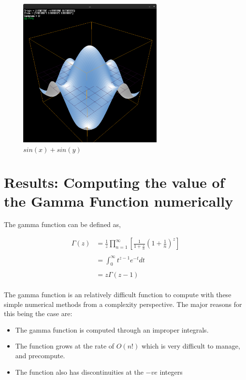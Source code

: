\documentclass[12pt]{article}
\begin{document}
\begin{figure}
	\centering
	\includegraphics[width=0.65\textwidth]{example2.png}
	\caption{$sin(x) + sin(y)$}
	\label{fig:example2}
\end{figure}

\pagebreak
\section{Results: Computing the value of the Gamma Function numerically}

The gamma function can be defined as,

\begin{align*}
	\Gamma(z) &= \frac{1}{z} \prod_{n = 1}^{\infty} \left[ \frac{1}{1 + \frac{z}{n}} \left(1 + \frac{1}{n} \right)^{z} \right]\\
	\\
	&= \int_0^\infty t^{z-1} e^{-t} dt\\
	\\
	&= z \Gamma(z - 1)
\end{align*}
\\
The gamma function is an relatively difficult function to compute with these simple numerical methods from
a complexity perspective. The major reasons for this being the case are:
\begin{itemize}
	\item The gamma function is computed through an improper integrals.
	\item The function grows at the rate of $O(n!)$ which is very difficult to manage, and precompute.
	\item The function also has discontinuities at the $-ve$ integers
\end{itemize}
\end{document}
